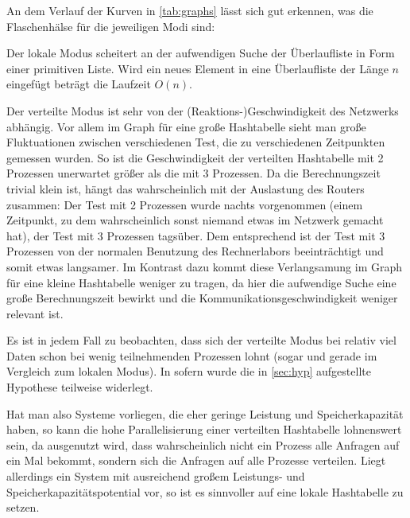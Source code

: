 \documentclass{scrreprt}
\begin{document}
An dem Verlauf der Kurven in \autoref{tab:graphs} lässt sich gut erkennen, was die Flaschenhälse für die jeweiligen Modi sind:\medskip

Der lokale Modus scheitert an der aufwendigen Suche der Überlaufliste in Form einer primitiven Liste. Wird ein neues Element in eine Überlaufliste der Länge $n$ eingefügt beträgt die Laufzeit $O(n)$.

Der verteilte Modus ist sehr von der (Reaktions-)Geschwindigkeit des Netzwerks abhängig. Vor allem im Graph für eine große Hashtabelle sieht man große Fluktuationen zwischen verschiedenen Test, die zu verschiedenen Zeitpunkten gemessen wurden. So ist die Geschwindigkeit der verteilten Hashtabelle mit 2 Prozessen unerwartet größer als die mit 3 Prozessen. Da die Berechnungszeit trivial klein ist, hängt das wahrscheinlich mit der Auslastung des Routers zusammen: Der Test mit 2 Prozessen wurde nachts vorgenommen (einem Zeitpunkt, zu dem wahrscheinlich sonst niemand etwas im Netzwerk gemacht hat), der Test mit 3 Prozessen tagsüber. Dem entsprechend ist der Test mit 3 Prozessen von der normalen Benutzung des Rechnerlabors beeinträchtigt und somit etwas langsamer. Im Kontrast dazu kommt diese Verlangsamung im Graph für eine kleine Hashtabelle weniger zu tragen, da hier die aufwendige Suche eine große Berechnungszeit bewirkt und die Kommunikationsgeschwindigkeit weniger relevant ist. \bigskip

Es ist in jedem Fall zu beobachten, dass sich der verteilte Modus bei relativ viel Daten schon bei wenig teilnehmenden Prozessen lohnt (sogar und gerade im Vergleich zum lokalen Modus). In sofern wurde die in \autoref{sec:hyp} aufgestellte Hypothese teilweise widerlegt.\bigskip

Hat man also Systeme vorliegen, die eher geringe Leistung und Speicherkapazität haben, so kann die hohe Parallelisierung einer verteilten Hashtabelle lohnenswert sein, da ausgenutzt wird, dass wahrscheinlich nicht ein Prozess alle Anfragen auf ein Mal bekommt, sondern sich die Anfragen auf alle Prozesse verteilen. Liegt allerdings ein System mit ausreichend großem Leistungs- und Speicherkapazitätspotential vor, so ist es sinnvoller auf eine lokale Hashtabelle zu setzen.

\end{document}
